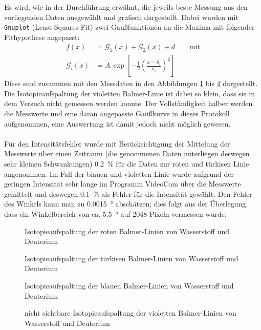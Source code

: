 \documentclass[11pt, a4paper]{article}
\numberwithin{equation}{section}
\begin{document}
Es wird, wie in der Durchführung erwähnt, die jeweils beste Messung aus den vorliegenden Daten ausgewählt und grafisch dargestellt.
Dabei wurden mit \texttt{Gnuplot} (Least-Squares-Fit) zwei Gaußfunktionen an die Maxima mit folgender Fithypothese angepasst:
\begin{align*}
f(x)&=\mathcal{G}_1(x)+\mathcal{G}_2(x) + d\qquad\text{mit}\\
\mathcal{G}_i(x)&=A\,\exp\left[-\frac{1}{2}\left(\frac{x-S_i}{\sigma_i}\right)^2\right]
\end{align*}
Diese sind zusammen mit den Messdaten in den Abbildungen \ref{fig:aufspaltung_rot} bis  \ref{fig:aufspaltung_violett} dargestellt.
Die Isotopieaufspaltung der violetten Balmer-Linie ist dabei so klein, dass sie in dem Versuch nicht gemessen werden konnte.
Der Vollständigkeit halber werden die Messwerte und eine daran angepasste Gaußkurve in dieses Protokoll aufgenommen, eine Auswertung ist damit jedoch nicht möglich gewesen.\\
\\
Für den Intensitätsfehler wurde mit Berücksichtigung der Mittelung der Messwerte über einen Zeitraum (die genommenen Daten unterliegen deswegen sehr kleinen Schwankungen) \SI{0.2}{\percent} für die Daten zur roten und türkisen Linie angenommen.
Im Fall der blauen und violetten Linie wurde aufgrund der geringen Intensität sehr lange im Programm VideoCom über die Messwerte gemittelt und deswegen \SI{0.1}{\percent} als Fehler für die Intensität gewählt.
Den Fehler des Winkels kann man zu \SI{0.0015}{\degree} abschätzen; dies folgt aus der Überlegung, dass ein Winkelbereich von ca. \SI{5.5}{\degree} auf \num{2048} Pixeln vermessen wurde.
\begin{figure}[h]
\centering

\caption{Isotopieaufspaltung der roten Balmer-Linien von Wasserstoff und Deuterium}
\label{fig:aufspaltung_rot}
\end{figure}
\begin{figure}[h]
\centering

\caption{Isotopieaufspaltung der türkisen Balmer-Linien von Wasserstoff und Deuterium}
\label{fig:aufspaltung_tuerkis}
\end{figure}
\begin{figure}[h]
\centering

\caption{Isotopieaufspaltung der blauen Balmer-Linien von Wasserstoff und Deuterium}
\label{fig:aufspaltung_blau}
\end{figure}
\begin{figure}[h]
\centering

\caption{nicht sichtbare Isotopieaufspaltung der violetten Balmer-Linien von Wasserstoff und Deuterium}
\label{fig:aufspaltung_violett}
\end{figure}
\end{document}
